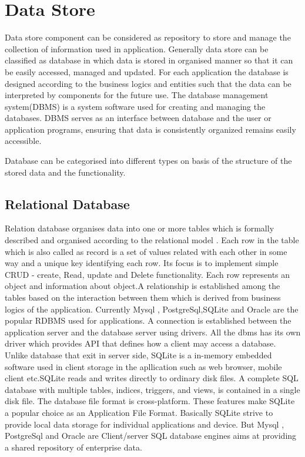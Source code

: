 \chapter{Data Store}\label{ch:ch6label}

			Data store component can be considered as repository to store and manage the collection of information used in application. Generally data store can be classified as database in which data is stored in organised manner so that it can be easily accessed, managed and updated. For each application the database is designed according to the business logics and entities such that the data can be interpreted by components for the future use. The database management system(DBMS) is a system software used for creating and managing the databases. DBMS serves as an interface between database and the user or application programs, ensuring that data is consistently organized remains easily accessible. 
			
			Database can be categorised into different types on basis of the  structure of the stored data and the functionality.

\section{Relational Database} 

                 Relation database organises data into one or more tables which is formally described and organised according to the relational model . Each row in the table which is also called as record is a set of values related with each other in some way and a unique key identifying each row. Its focus is to implement simple CRUD - create, Read, update and Delete functionality. Each row represents an object and information about object.A relationship is established among the tables based on the interaction between them  which is derived from business logics of the application. Currently Mysql , PostgreSql,SQLite and Oracle are the popular RDBMS used for applications.  A connection is established between the application server and the database server using drivers. All the dbms has its own driver which provides API that defines how a client may access a database. Unlike database that exit in server side, SQLite is a in-memory embedded software used in client storage in the apllication such as web browser, mobile client etc.SQLite reads and writes directly to ordinary disk files. A complete SQL database with multiple tables, indices, triggers, and views, is contained in a single disk file. The database file format is cross-platform. These features make SQLite a popular choice as an Application File Format.  Basically  SQLite strive to provide local data storage for individual applications and device. But Mysql , PostgreSql and Oracle are Client/server SQL database engines aims at providing a shared repository of enterprise data.  
                   

